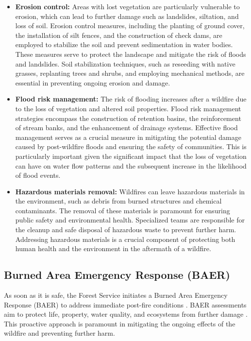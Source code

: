 \documentclass[
  12 pt,
]{Nemilov}
\begin{document}
\begin{itemize}
\item
  \textbf{Erosion control:} Areas with lost vegetation are particularly vulnerable to erosion, which can lead to further damage such as landslides, siltation, and loss of soil. Erosion control measures, including the planting of ground cover, the installation of silt fences, and the construction of check dams, are employed to stabilize the soil and prevent sedimentation in water bodies. These measures serve to protect the landscape and mitigate the risk of floods and landslides. Soil stabilization techniques, such as reseeding with native grasses, replanting trees and shrubs, and employing mechanical methods, are essential in preventing ongoing erosion and damage.
\item
  \textbf{Flood risk management:} The risk of flooding increases after a wildfire due to the loss of vegetation and altered soil properties. Flood risk management strategies encompass the construction of retention basins, the reinforcement of stream banks, and the enhancement of drainage systems. Effective flood management serves as a crucial measure in mitigating the potential damage caused by post-wildfire floods and ensuring the safety of communities. This is particularly important given the significant impact that the loss of vegetation can have on water flow patterns and the subsequent increase in the likelihood of flood events.
\item
  \textbf{Hazardous materials removal:} Wildfires can leave hazardous materials in the environment, such as debris from burned structures and chemical contaminants. The removal of these materials is paramount for ensuring public safety and environmental health. Specialized teams are responsible for the cleanup and safe disposal of hazardous waste to prevent further harm. Addressing hazardous materials is a crucial component of protecting both human health and the environment in the aftermath of a wildfire.
\end{itemize}

\subsection{Burned Area Emergency Response (BAER)}\label{burned-area-emergency-response-baer}

As soon as it is safe, the Forest Service initiates a Burned Area Emergency Response (BAER) to address immediate post-fire conditions \citep{tracy1994burned, witt1999burned}. BAER assessments aim to protect life, property, water quality, and ecosystems from further damage \citep{olsen2007citizen}. This proactive approach is paramount in mitigating the ongoing effects of the wildfire and preventing further harm.
\end{document}
